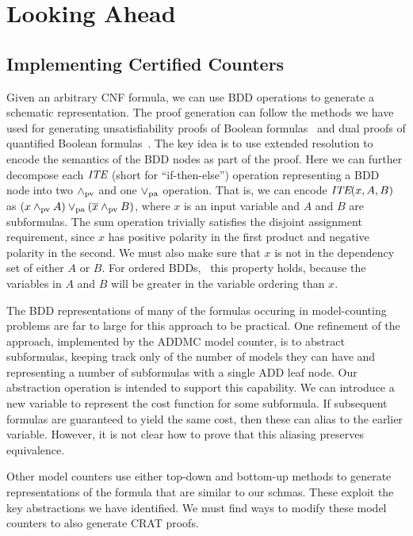 \documentclass{llncs}
\newcommand{\pand}{\mathbin{\land_{\rm pv}}}
\newcommand{\por}{\mathbin{\lor_{\rm pa}}}
\newcommand{\obar}[1]{\overline{#1}}
\newcommand{\ite}{\mbox{\it ITE}}
\begin{document}
\section{Looking Ahead}

\subsection{Implementing Certified Counters}

Given an arbitrary CNF formula, we can use BDD operations to generate
a schematic representation.  The proof generation can follow the
methods we have used for generating unsatisfiability proofs of Boolean
formulas~\cite{bryant:tacas:2021} and dual proofs of quantified
Boolean formulas~\cite{bryant:cade:2021}.  The key idea 
is to use extended resolution to encode the semantics of the BDD
nodes as part of the proof.  Here we can further decompose each $\ite$
(short for ``if-then-else'') operation representing a BDD node into
two $\pand$ and one $\por$ operation.  That is, we can encode
$\ite(x,A,B)$ as $(x \pand A) \por (\obar{x} \pand B)$, where $x$ is an
input variable and $A$ and $B$ are subformulas.  The sum operation trivially satisfies the disjoint assignment requirement, since $x$ has positive polarity in the first product and negative polarity in the second.
We must also
make sure that $x$ is not in the dependency set of either $A$ or $B$.
For ordered BDDs,~\cite{Bryant:1986} this property holds, because the
variables in $A$ and $B$ will be greater in the variable ordering than
$x$.

The BDD representations of many of the formulas occuring in
model-counting problems are far to large for this approach to be
practical.  One refinement of the approach, implemented by the ADDMC
model counter, is to abstract subformulas, keeping track only of the
number of models they can have and representing a number of subformulas
with a single ADD leaf node.  Our abstraction operation is intended to
support this capability.  We can
introduce a new variable to represent the cost function for some
subformula.  If subsequent formulas are guaranteed to yield the same
cost, then these can alias to the earlier variable.  However, it is
not clear how to prove that this aliasing preserves equivalence.

Other model counters use either top-down and bottom-up methods to
generate representations of the formula that are similar to our
schmas.  These exploit the key abstractions we have identified.  We
must find ways to modify these model counters to also generate CRAT
proofs.
\end{document}
